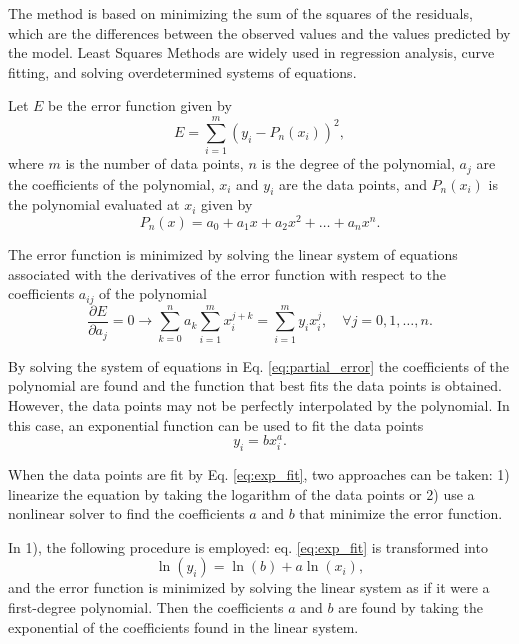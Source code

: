 The method is based on minimizing the sum of the squares of the residuals, which are the differences between the observed values and the values predicted by the model. Least Squares Methods are widely used in regression analysis, curve fitting, and solving overdetermined systems of equations.

Let $E$ be the error function given by 
\begin{equation}
    E = \sum_{i=1}^{m} (y_i - P_n(x_i))^2,
\end{equation}
where $m$ is the number of data points, $n$ is the degree of the polynomial, $a_j$ are the coefficients of the polynomial, $x_i$ and $y_i$ are the data points, and $P_n(x_i)$ is the polynomial evaluated at $x_i$ given by 
\begin{equation}
    P_n(x) = a_0 + a_1x + a_2x^2 + \ldots + a_nx^n.
\end{equation} 

The error function is minimized by solving the linear system of equations associated with the derivatives of the error function with respect to the coefficients $a_{ij}$ of the polynomial
\begin{equation}
    \frac{\partial E}{\partial a_j} = 0 \rightarrow \sum_{k=0}^n a_k \sum_{i=1}^m x_i^{j+k} = \sum_{i=1}^m y_i x_i^j, \quad \forall j = 0,1,\ldots,n.
    \label{eq:partial_error}
\end{equation}

By solving the system of equations in Eq. \eqref{eq:partial_error} the coefficients of the polynomial are found and the function that best fits the data points is obtained. However, the data points may not be perfectly interpolated by the polynomial. In this case, an exponential function can be used to fit the data points
\begin{equation}
    y_i = bx_i^a.
    \label{eq:exp_fit}
\end{equation}

When the data points are fit by Eq. \eqref{eq:exp_fit}, two approaches can be taken: 1) linearize the equation by taking the logarithm of the data points or 2) use a nonlinear solver to find the coefficients $a$ and $b$ that minimize the error function.

In 1), the following procedure is employed: eq. \eqref{eq:exp_fit} is transformed into
\begin{equation}
    \ln(y_i) = \ln(b) + a\ln(x_i),
\end{equation}
and the error function is minimized by solving the linear system as if it were a first-degree polynomial. Then the coefficients $a$ and $b$ are found by taking the exponential of the coefficients found in the linear system. 

